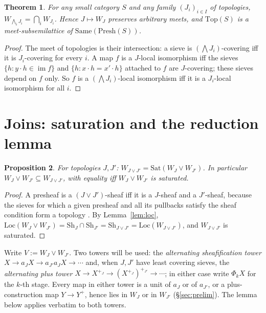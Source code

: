 \documentclass[11pt]{amsart}
\newtheorem{thm}{Theorem}[section]
\newtheorem{prop}[thm]{Proposition}
\theoremstyle{definition}
\newcommand{\Same}{\mathrm{Same}}
\newcommand{\Top}{\mathrm{Top}}
\newcommand{\Presh}{\mathrm{Presh}}
\newcommand{\Sh}{\mathrm{Sh}}
\newcommand{\Sat}{\mathrm{Sat}}
\newcommand{\Loc}{\mathrm{Loc}}
\begin{document}
\begin{thm}\label{thm:meet}
For any small category $S$ and any family $(J_i)_{i\in I}$ of topologies,
$W_{\bigwedge_iJ_i}=\bigcap_iW_{J_i}$. Hence $J\mapsto W_J$ preserves arbitrary
meets, and $\Top(S)$ is a meet-subsemilattice of $\Same(\Presh(S))$.
\end{thm}
\begin{proof}
The meet of topologies is their intersection: a sieve is $(\bigwedge J_i)$-covering
iff it is $J_i$-covering for every $i$. A map $f$ is a $J$-local isomorphism
iff the sieves $\{h:y\cdot h\in\operatorname{im}f\}$ and $\{h:x\cdot h=x'\cdot h\}$
attached to $f$ are $J$-covering; these sieves depend on $f$ only. So $f$ is a
$(\bigwedge J_i)$-local isomorphism iff it is a $J_i$-local isomorphism for all $i$.
\end{proof}

\section{Joins: saturation and the reduction lemma}\label{sec:join}

\begin{prop}\label{prop:sat}
For topologies $J,J'$: $W_{J\vee J'}=\Sat(W_J\vee W_{J'})$. In particular
$W_J\vee W_{J'}\subseteq W_{J\vee J'}$, with equality iff $W_J\vee W_{J'}$ is
saturated.
\end{prop}
\begin{proof}
A presheaf is a $(J\vee J')$-sheaf iff it is a $J$-sheaf and a $J'$-sheaf,
because the sieves for which a given presheaf and all its pullbacks satisfy
the sheaf condition form a topology \cite[C2.1]{Elephant}. By
Lemma~\ref{lem:loc}, $\Loc(W_J\vee W_{J'})=\Sh_J\cap\Sh_{J'}=\Sh_{J\vee J'}
=\Loc(W_{J\vee J'})$, and $W_{J\vee J'}$ is saturated.
\end{proof}

Write $V:=W_J\vee W_{J'}$. Two towers will be used: the \emph{alternating
sheafification tower} $X\to a_JX\to a_{J'}a_JX\to\cdots$ and, when $J,J'$ have
least covering sieves, the \emph{alternating plus tower}
$X\to X^{+_J}\to(X^{+_J})^{+_{J'}}\to\cdots$; in either case write $\Phi_kX$ for
the $k$-th stage. Every map in either tower is a unit of $a_J$ or of $a_{J'}$,
or a plus-construction map $Y\to Y^{+}$, hence lies in $W_J$ or in $W_{J'}$
(\S\ref{sec:prelim}). The lemma below applies verbatim to both towers.
\end{document}
